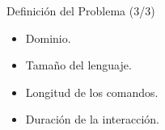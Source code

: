 




\begin{frame}{Definici\'on del Problema (3/3)}

\begin{itemize}
    \vfill \item<+->{Dominio.}
    \vfill \item<+->{Tama\~no del lenguaje.}
    \vfill \item<+->{Longitud de los comandos.}
    \vfill \item<+->{Duraci\'on de la interacci\'on.}
\end{itemize}

\end{frame}